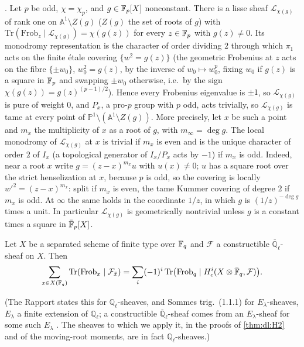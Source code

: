 \begin{enumerate}[label=\textup{(E\arabic*)},leftmargin=*]
  \cite[Sommes trig., 1.2--1.8, in particular (1.7.6)]{SGA4half}. Let $p$ be
  odd, $\chi=\chi_p$, and $g\in\mathbb F_p[X]$ nonconstant. There is a lisse sheaf
  $\mathcal L_{\chi(g)}$ of rank one on $\mathbb A^1\setminus Z(g)$
  ($Z(g)$ the set of roots of $g$) with
  $\mathrm{Tr}(\mathrm{Frob}_z\mid\mathcal L_{\chi(g)})=\chi(g(z))$ for
  every $z\in\mathbb F_p$ with $g(z)\ne0$. Its monodromy representation is the
  character of order dividing $2$ through which $\pi_1$ acts on the finite
  \'etale covering $\{w^2=g(z)\}$ (the geometric Frobenius at $z$ acts on the
  fibre $\{\pm w_0\}$, $w_0^2=g(z)$, by the inverse of $w_0\mapsto w_0^p$, fixing $w_0$ if $g(z)$ is a square in $\mathbb F_p$ and swapping $\pm w_0$ otherwise, i.e.\ by the
  sign $\chi(g(z))=g(z)^{(p-1)/2}$). Hence every Frobenius eigenvalue is
  $\pm1$, so $\mathcal L_{\chi(g)}$ is pure of weight $0$, and $P_x$, a
  pro-$p$ group with $p$ odd, acts trivially, so $\mathcal L_{\chi(g)}$ is
  tame at every point of $\mathbb P^1\setminus(\mathbb A^1\setminus Z(g))$.
  More precisely, let $x$ be such a point and $m_x$ the multiplicity of $x$
  as a root of $g$, with $m_\infty=\deg g$. The local monodromy of
  $\mathcal L_{\chi(g)}$ at $x$ is trivial if $m_x$ is even and is the
  unique character of order $2$ of $I_x$ (a topological generator of
  $I_x/P_x$ acts by $-1$) if $m_x$ is odd. Indeed, near a root $x$ write
  $g=(z-x)^{m_x}u$ with $u(x)\ne0$; $u$ has a square root over the strict
  henselization at $x$, because $p$ is odd, so the covering is locally
  $w'^2=(z-x)^{m_x}$: split if $m_x$ is even, the tame Kummer covering of
  degree $2$ if $m_x$ is odd. At $\infty$ the same holds in the coordinate
  $1/z$, in which $g$ is $(1/z)^{-\deg g}$ times a unit. In particular
  $\mathcal L_{\chi(g)}$ is geometrically nontrivial unless $g$ is a constant
  times a square in $\bar{\mathbb F}_p[X]$.
\end{enumerate}

\begin{theorem}\label{thm:prelim:lefschetz}
Let $X$ be a separated scheme of finite type over $\mathbb F_q$ and $\mathcal F$ a
constructible $\overline{\mathbb Q}_\ell$-sheaf on $X$. Then
\[
  \sum_{x\in X(\mathbb F_q)}\mathrm{Tr}(\mathrm{Frob}_x\mid\mathcal F_{\bar x})
  =\sum_i(-1)^i\,\mathrm{Tr}\big(\mathrm{Frob}_q\mid
  H^i_c(X\otimes\bar{\mathbb F}_q,\mathcal F)\big).
\]
\end{theorem}

\noindent (The Rapport states this for $\mathbb Q_\ell$-sheaves, and Sommes
trig.\ (1.1.1) for $E_\lambda$-sheaves, $E_\lambda$ a finite extension of
$\mathbb Q_\ell$; a constructible $\overline{\mathbb Q}_\ell$-sheaf comes from
an $E_\lambda$-sheaf for some such $E_\lambda$
\cite[(1.1.1), (1.1.6)]{DeligneWeilII}. The sheaves to which we apply it, in
the proofs of \cref{thm:dl:H2} and of the moving-root moments, are in fact
$\mathbb Q_\ell$-sheaves.)

